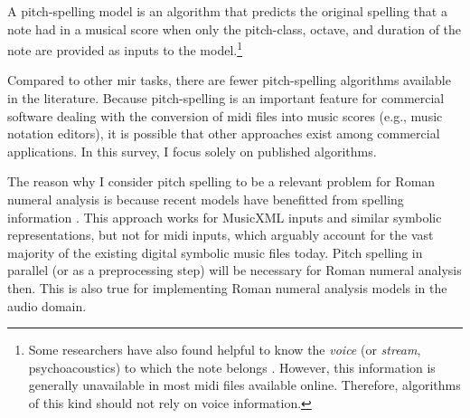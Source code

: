 

A pitch-spelling model is an algorithm that predicts the
original spelling that a note had in a musical score when
only the pitch-class, octave, and duration of the note are
provided as inputs to the model.\footnote{Some researchers
have also found helpful to know the \emph{voice} (or
\emph{stream}, psychoacoustics) to which the note belongs
\parencite{teodoru2007pitch}. However, this information is
generally unavailable in most \gls{midi} files available
online. Therefore, algorithms of this kind should not rely
on voice information.}


Compared to other \gls{mir} tasks, there are fewer
pitch-spelling algorithms available in the literature.
Because pitch-spelling is an important feature for
commercial software dealing with the conversion of
\gls{midi} files into music scores (e.g., music notation
editors), it is possible that other approaches exist among
commercial applications. In this survey, I focus solely on
published algorithms.

The reason why I consider pitch spelling to be a relevant
problem for Roman numeral analysis is because recent models
have benefitted from spelling information
\parencite{micchi2020not}. This approach works for MusicXML
inputs and similar symbolic representations, but not for
\gls{midi} inputs, which arguably account for the vast
majority of the existing digital symbolic music files today.
Pitch spelling in parallel (or as a preprocessing step) will
be necessary for Roman numeral analysis then. This is also
true for implementing Roman numeral analysis models in the
audio domain.
